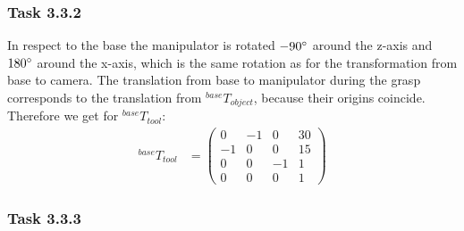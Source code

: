 \subsubsection*{Task 3.3.2}
In respect to the base the manipulator is rotated $-90\degree$ around the z-axis and $180\degree$ around the x-axis, which is the same rotation as for the transformation from base to camera.
The translation from base to manipulator during the grasp corresponds to the translation from $^{base}T_{object}$, because their origins coincide.
Therefore we get for $^{base}T_{tool}$:
\begin{align*}
^{base}T_{tool} &=
\begin{pmatrix}
0 & -1 & 0 & 30\\
-1 & 0 & 0 & 15\\
0 & 0 & -1 & 1\\
0 & 0 & 0 & 1
\end{pmatrix}
\end{align*}

\subsubsection*{Task 3.3.3}




